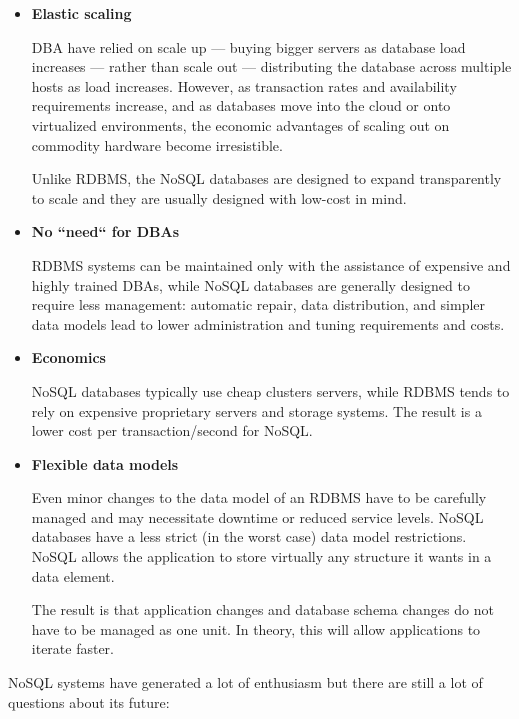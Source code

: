 \begin{itemize}

\item \textbf{Elastic scaling}

DBA have relied on scale up — buying bigger servers as database load increases — rather than scale out — distributing the database across multiple hosts as load increases. However, as transaction rates and availability requirements increase, and as databases move into the cloud or onto virtualized environments, the economic advantages of scaling out on commodity hardware become irresistible.

Unlike RDBMS, the NoSQL databases are designed to expand transparently to scale and they are usually designed with low-cost in mind.


\item \textbf{No ``need`` for DBAs}

RDBMS systems can be maintained only with the assistance of expensive and highly trained DBAs, while NoSQL databases are generally designed to require less management:  automatic repair, data distribution, and simpler data models lead to lower administration and tuning requirements and costs.


\item \textbf{Economics}

NoSQL databases typically use cheap clusters servers, while RDBMS tends to rely on expensive proprietary servers and storage systems. The result is a lower cost per transaction/second for NoSQL.


\item \textbf{Flexible data models}

Even minor changes to the data model of an RDBMS have to be carefully managed and may necessitate downtime or reduced service levels. NoSQL databases have a less strict (in the worst case) data model restrictions. NoSQL allows the application to store virtually any structure it wants in a data element.

The result is that application changes and database schema changes do not have to be managed as one unit. In theory, this will allow applications to iterate faster.

\end{itemize}


NoSQL systems have generated a lot of enthusiasm but there are still a lot of questions about its future:

